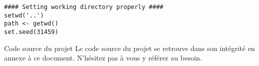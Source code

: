 \begin{lstlisting}[caption = Environnement de travail,label=src:WDsettings]
#### Setting working directory properly ####
setwd('..')
path <- getwd()
set.seed(31459)
\end{lstlisting} 

\begin{moreInfo}{Code source du projet}
	Le code source du projet se retrouve dans son intégrité en annexe à ce document. N'hésitez pas à vous y référer au besoin. \\
\end{moreInfo}